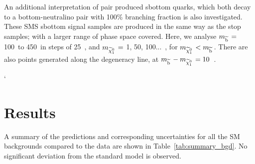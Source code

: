 An additional interpretation of pair produced sbottom quarks, which both decay to a bottom-neutralino pair 
with 100\% branching fraction is also investigated.
These SMS sbottom signal samples are produced in the same way as the stop samples; with a larger range of phase space covered. 
Here, we analyse
$m_{\widetilde{{\rm b}}\,} =$100~\GeV to 450~\GeV in steps of 25~\GeV, and 
$m_{\widetilde{\chi}^{0}_{1}\,} = $ 1, 50, 100...~\GeV, for $m_{\widetilde{\chi}^{0}_{1}\,} < m_{\widetilde{{\rm b}}\,}$.
There are also points generated along the degeneracy line, at 
$m_{\widetilde{{\rm b}}\,} - m_{\widetilde{\chi}^{0}_{1}\,} = 10$~\GeV.


`

\section{Results}
A summary of the predictions and corresponding uncertainties for all the SM backgrounds compared to the data are shown in Table~\ref{tab:summary_bgd}.
No significant deviation from the standard model is observed.


